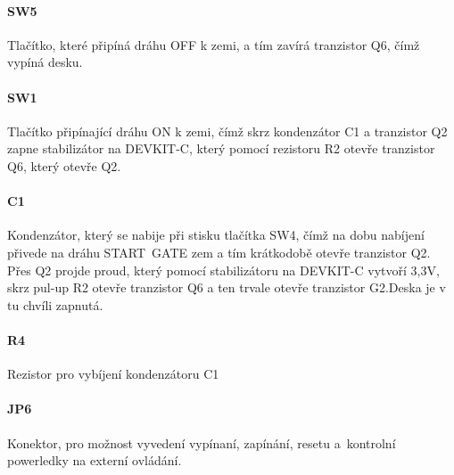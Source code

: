 \documentclass{template/socthesis}
\begin{document}
\begin{itemize}
	\paragraph*{SW5}
	Tlačítko, které připíná dráhu OFF k zemi, a tím zavírá tranzistor Q6, čímž vypíná desku.
	
	\paragraph*{SW1}
	Tlačítko připínající dráhu ON k zemi, čímž skrz kondenzátor C1 a tranzistor Q2 zapne stabilizátor na DEVKIT-C, který pomocí rezistoru R2 otevře tranzistor Q6, který otevře Q2. 
	
	\paragraph*{C1}
	Kondenzátor, který se nabije při stisku tlačítka SW4, čímž na dobu nabíjení přivede na dráhu START~GATE zem a tím krátkodobě otevře tranzistor Q2. Přes Q2 projde proud, který pomocí stabilizátoru na DEVKIT-C vytvoří 3,3V, skrz pul-up R2 otevře tranzistor Q6 a ten trvale otevře tranzistor G2.Deska je v tu chvíli zapnutá.
	
	\paragraph*{R4}
	Rezistor pro vybíjení kondenzátoru C1
	
	\paragraph*{JP6}
	Konektor, pro možnost vyvedení vypínaní, zapínání, resetu 
	a~kontrolní powerledky na externí ovládání.
	

\end{itemize}
\end{document}
